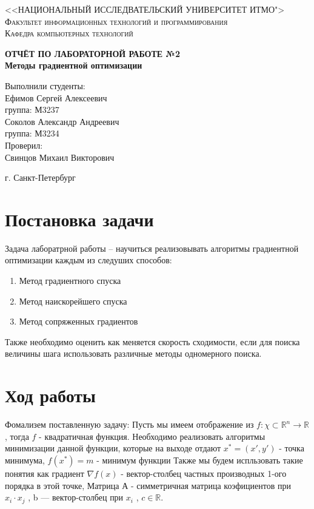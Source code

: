 \documentclass[a4paper, 14pt]{article}
\begin{document}
	\renewcommand{\chaptername}{Лабораторная работа}
	\def\contentsname{Содержание}

	\begin{titlepage}
		\begin{center}
			\textsc{<<НАЦИОНАЛЬНЫЙ ИССЛЕДВАТЕЛЬСКИЙ УНИВЕРСИТЕТ ИТМО">\\[5mm]
			Факультет информационных технологий и программирования\\[2mm]
			Кафедра компьютерных технологий}

			\vfill

			\textbf{ОТЧЁТ ПО ЛАБОРАТОРНОЙ РАБОТЕ №2\\[3mm]
			Методы градиентной оптимизации\\[28mm]
			}
		\end{center}

		\hfill
		\begin{minipage}{.5\textwidth}
			Выполнили студенты:\\[2mm]
			Ефимов Сергей Алексеевич\\
			группа: М3237\\[2mm]
			Соколов Александр Андреевич\\
			группа: М3234\\[5mm]

			Проверил:\\[2mm]
			Свинцов Михаил Викторович
		\end{minipage}%
		\vfill
		\begin{center}
			г. Санкт-Петербург
		\end{center}
	\end{titlepage}


	\section*{Постановка задачи}
	Задача лаборатрной работы  -- научиться реализовывать алгоритмы градиентной оптимизации каждым из следуших способов:
	\begin{enumerate}
		\item Метод градиентного спуска
		\item Метод наискорейшего спуска
		\item Метод сопряженных градиентов
	\end{enumerate}
	Также необходимо оценить как меняется скорость сходимости, если для поиска величины шага использовать различные методы одномерного поиска.
	\section*{Ход работы}
	Фомализем поставленную задачу:
	Пусть мы имеем отображение из $f: \chi \subset \mathbb{R}^n \longrightarrow \mathbb{R}$, тогда $f$ - квадратичная функция. Необходимо реализовать алгоритмы минимизации данной функции, которые на выходе отдают $x^* = (x', y')$ - точка минимума, $f(x^*) = m$ - минимум функции
	Также мы будем испльзовать такие понятия как градиент $\nabla f(x)$ - вектор-столбец частных производных 1-ого порядка в этой точке, Матрица А - симметричная матрица коэфициентов при $x_i \cdot x_j$ , b — вектор-столбец при $x_i$ , $c \in \mathbb{R}$.	
\end{document}
